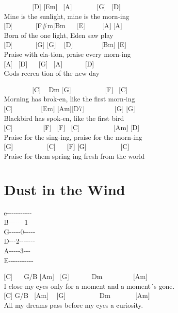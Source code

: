 \documentclass[
  letterpaper,
  twoside=false]{scrbook}
\begin{document}
~ ~ ~ ~ ~ {[}D{]} {[}Em{]} ~{[}A{]} ~ ~ ~ ~ {[}G{]} ~{[}D{]}\\
Mine is the sunlight, mine is the morn-ing\\
{[}D{]} ~ ~ ~ ~{[}F\#m{]}Bm ~ ~{[}E{]} ~ ~ ~{[}A{]} {[}A{]}\\
Born of the one light, Eden saw play\\
{[}D{]} ~ ~ ~ ~{[}G{]} {[}G{]} ~ {[}D{]} ~ ~ ~ ~ ~{[}Bm{]} {[}E{]}\\
Praise with ela-tion, praise every morn-ing\\
{[}A{]} ~{[}D{]} ~ ~{[}G{]} ~{[}A{]} ~ ~ ~ ~{[}D{]}\\
God\textquotesingle s recrea-tion of the new day

~ ~ ~ ~ ~ {[}C{]} ~ Dm {[}G{]} ~ ~ ~ ~ ~ ~{[}F{]} ~{[}C{]}\\
Morning has brok-en, like the first morn-ing\\
{[}C{]} ~ ~ ~ ~ ~{[}Em{]} {[}Am{]}{[}D7{]} ~ ~ ~ ~ ~ {[}G{]} {[}G{]}\\
Blackbird has spok-en, like the first bird\\
{[}C{]} ~ ~ ~ ~ ~ {[}F{]} ~{[}F{]} ~{[}C{]} ~ ~ ~ ~ ~ ~{[}Am{]}
{[}D{]}\\
Praise for the sing-ing, praise for the morn-ing\\
{[}G{]} ~ ~ ~ ~ ~ ~{[}C{]} ~ ~{[}F{]} {[}G{]} ~ ~ ~ ~ ~ ~{[}C{]}\\
Praise for them spring-ing fresh from the world

\hypertarget{dust-in-the-wind}{%
\chapter{Dust in the Wind}\label{dust-in-the-wind}}

e\textbar-\/-\/-\/-\/-\/-\/-\/-\/-\/-\/-\textbar{}\\
B-\/-\/-\/-\/-\/-\/-1-\textbar{}\\
G\textbar-\/-\/-\/-\/-0-\/-\/-\/-\/-\textbar{}\\
D\textbar-\/-\/-2-\/-\/-\/-\/-\/-\/-\textbar{}\\
A-\/-\/-\/-\/-3-\/-\/-\textbar{}\\
E\textbar-\/-\/-\/-\/-\/-\/-\/-\/-\/-\/-\textbar{}

{[}C{]} ~ ~G/B {[}Am{]} ~{[}G{]} ~ ~ ~ ~Dm ~ ~ ~ ~ ~ {[}Am{]}\\
I close my eyes only for a moment and a moment´s gone.\\
{[}C{]} G/B ~{[}Am{]} ~ {[}G{]} ~ ~ ~ ~ ~ ~Dm ~ ~ ~ ~ {[}Am{]}\\
All my dreams pass before my eyes a curiosity.
\end{document}

